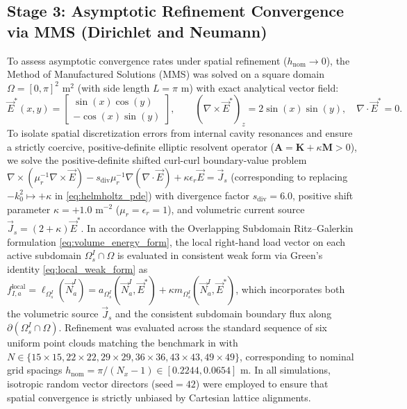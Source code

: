 \documentclass[VANCOUVER,Times1COL]{WileyNJD-v5}
\begin{document}
\subsection{Stage 3: Asymptotic Refinement Convergence via MMS (Dirichlet and Neumann)}
\label{subsec:stage3_mms}

To assess asymptotic convergence rates under spatial refinement ($h_{\mathrm{nom}} \to 0$), the Method of Manufactured Solutions (MMS) was solved on a square domain $\Omega = [0, \pi]^2\text{ m}^2$ (with side length $L = \pi\text{ m}$) with exact analytical vector field:
\begin{equation}
    \vec{E}^*(x, y) = \begin{bmatrix} \sin(x) \cos(y) \\ -\cos(x) \sin(y) \end{bmatrix}, \qquad (\nabla \times \vec{E}^*)_z = 2\sin(x)\sin(y), \quad \nabla \cdot \vec{E}^* = 0.
\end{equation}
To isolate spatial discretization errors from internal cavity resonances and ensure a strictly coercive, positive-definite elliptic resolvent operator ($\mathbf{A} = \mathbf{K} + \kappa \mathbf{M} > 0$), we solve the positive-definite shifted curl-curl boundary-value problem $\nabla \times (\mu_r^{-1} \nabla \times \vec{E}) - s_{\mathrm{div}} \mu_r^{-1} \nabla(\nabla \cdot \vec{E}) + \kappa \epsilon_r \vec{E} = \vec{J}_s$ (corresponding to replacing $-k_0^2 \mapsto +\kappa$ in \eqref{eq:helmholtz_pde}) with divergence factor $s_{\mathrm{div}} = 6.0$, positive shift parameter $\kappa = +1.0\text{ m}^{-2}$ ($\mu_r = \epsilon_r = 1$), and volumetric current source $\vec{J}_s = (2 + \kappa) \vec{E}^*$. In accordance with the Overlapping Subdomain Ritz--Galerkin formulation \eqref{eq:volume_energy_form}, the local right-hand load vector on each active subdomain $\Omega_s^I \cap \Omega$ is evaluated in consistent weak form via Green's identity \eqref{eq:local_weak_form} as $f_{I, a}^{\mathrm{local}} = \ell_{\Omega_s^I}(\vec{N}_a^I) = a_{\Omega_s^I}(\vec{N}_a^I, \vec{E}^*) + \kappa m_{\Omega_s^I}(\vec{N}_a^I, \vec{E}^*)$, which incorporates both the volumetric source $\vec{J}_s$ and the consistent subdomain boundary flux along $\partial(\Omega_s^I \cap \Omega)$. Refinement was evaluated across the standard sequence of six uniform point clouds matching the benchmark in \cite{stable_vnmm2d_2026} with $N \in \{15 \times 15, 22 \times 22, 29 \times 29, 36 \times 36, 43 \times 43, 49 \times 49\}$, corresponding to nominal grid spacings $h_{\mathrm{nom}} = \pi/(N_x-1) \in [0.2244, 0.0654]\text{ m}$. In all simulations, isotropic random vector directors ($\text{seed}=42$) were employed to ensure that spatial convergence is strictly unbiased by Cartesian lattice alignments.
\end{document}
